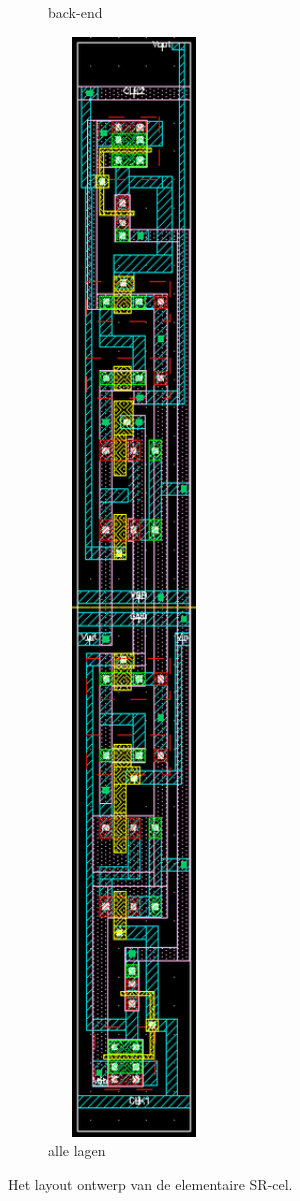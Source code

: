 \documentclass[11pt,a4paper,oneside,dutch]{article}
\begin{document}
\begin{figure}[htp]
\begin{subfigure}[b]{0.25\textwidth}
		\caption{back-end}
	\end{subfigure}
	\begin{subfigure}[b]{0.25\textwidth}
		\centering
		\includegraphics[width=0.5\textwidth]{elementary_all.png}
		\caption{alle lagen}
	\end{subfigure}
	
	\caption{Het layout ontwerp van de elementaire SR-cel.}
	\label{fig:elementary}
\end{figure}
\end{document}
